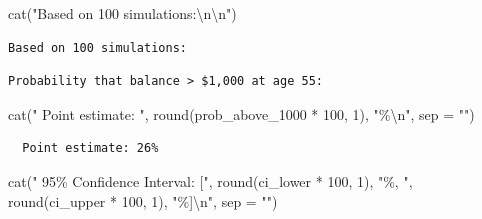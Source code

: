 \documentclass[
  letterpaper,
  DIV=11,
  numbers=noendperiod]{scrartcl}
\newenvironment{Shaded}{\begin{snugshade}}{\end{snugshade}}
\newcommand{\AttributeTok}[1]{\textcolor[rgb]{0.40,0.45,0.13}{#1}}
\newcommand{\DecValTok}[1]{\textcolor[rgb]{0.68,0.00,0.00}{#1}}
\newcommand{\FunctionTok}[1]{\textcolor[rgb]{0.28,0.35,0.67}{#1}}
\newcommand{\NormalTok}[1]{\textcolor[rgb]{0.00,0.23,0.31}{#1}}
\newcommand{\SpecialCharTok}[1]{\textcolor[rgb]{0.37,0.37,0.37}{#1}}
\newcommand{\StringTok}[1]{\textcolor[rgb]{0.13,0.47,0.30}{#1}}
\begin{document}
\begin{Shaded}
\begin{Highlighting}[]
\FunctionTok{cat}\NormalTok{(}\StringTok{"Based on 100 simulations:}\SpecialCharTok{\textbackslash{}n\textbackslash{}n}\StringTok{"}\NormalTok{)}
\end{Highlighting}
\end{Shaded}

\begin{verbatim}
Based on 100 simulations:
\end{verbatim}

\begin{Shaded}
\end{Shaded}

\begin{verbatim}
Probability that balance > $1,000 at age 55:
\end{verbatim}

\begin{Shaded}
\begin{Highlighting}[]
\FunctionTok{cat}\NormalTok{(}\StringTok{"  Point estimate: "}\NormalTok{, }\FunctionTok{round}\NormalTok{(prob\_above\_1000 }\SpecialCharTok{*} \DecValTok{100}\NormalTok{, }\DecValTok{1}\NormalTok{), }\StringTok{"\%}\SpecialCharTok{\textbackslash{}n}\StringTok{"}\NormalTok{, }\AttributeTok{sep =} \StringTok{""}\NormalTok{)}
\end{Highlighting}
\end{Shaded}

\begin{verbatim}
  Point estimate: 26%
\end{verbatim}

\begin{Shaded}
\begin{Highlighting}[]
\FunctionTok{cat}\NormalTok{(}\StringTok{"  95\% Confidence Interval: ["}\NormalTok{, }\FunctionTok{round}\NormalTok{(ci\_lower }\SpecialCharTok{*} \DecValTok{100}\NormalTok{, }\DecValTok{1}\NormalTok{), }\StringTok{"\%, "}\NormalTok{, }\FunctionTok{round}\NormalTok{(ci\_upper }\SpecialCharTok{*} \DecValTok{100}\NormalTok{, }\DecValTok{1}\NormalTok{), }\StringTok{"\%]}\SpecialCharTok{\textbackslash{}n}\StringTok{"}\NormalTok{, }\AttributeTok{sep =} \StringTok{""}\NormalTok{)}
\end{Highlighting}
\end{Shaded}
\end{document}
